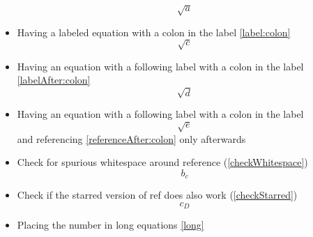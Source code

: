 \documentclass{article}
\def\ifcleveref#1{#1}%
\def\ifcleveref#1{}%
\begin{document}
\begin{itemize}
			\begin{equation}\label{unreferenced}
				\sqrt{a}
			\end{equation}
		\item Having a labeled equation with a colon in the label \ref{label:colon}
			\begin{equation}\label{label:colon}
				\sqrt{c}
			\end{equation}
		\item Having an equation with a following label with a colon in the label \ref{labelAfter:colon}
			\begin{equation}
				\sqrt{d}\label{labelAfter:colon}
			\end{equation}
		\item Having an equation with a following label with a colon in the label
			\begin{equation}
				\sqrt{e}\label{referenceAfter:colon}
			\end{equation}
			and referencing \ref{referenceAfter:colon} only afterwards
		\item Check for spurious whitespace around reference (\ref{checkWhitespace})
			\begin{equation}\label{checkWhitespace}
				b_c
			\end{equation}
		\item Check if the starred version of ref does also work (\ref*{checkStarred})
			\begin{equation}\label{checkStarred}
				c_D
			\end{equation}
		\ifcleveref{
			\item Check if the starred version of cref does also work (\cref*{checkStarredCref})
				\begin{equation}\label{checkStarredCref}
					d_E
				\end{equation}
		}
		\item Placing the number in long equations \ref{long}

\end{itemize}
\end{document}
